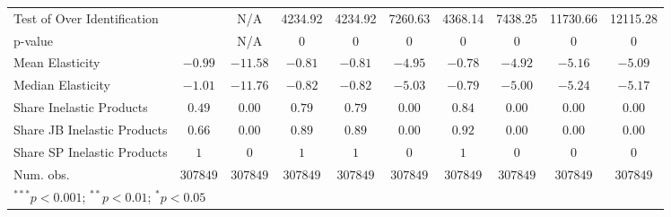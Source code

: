 \begin{tabular}{l c c c c c c c c c}
Test of Over Identification &               & N/A           & 4234.92       & 4234.92       & 7260.63       & 4368.14       & 7438.25       & 11730.66      & 12115.28      \\
p-value                     &               & N/A           & 0             & 0             & 0             & 0             & 0             & 0             & 0             \\
Mean Elasticity             & $-0.99$       & $-11.58$      & $-0.81$       & $-0.81$       & $-4.95$       & $-0.78$       & $-4.92$       & $-5.16$       & $-5.09$       \\
Median Elasticity           & $-1.01$       & $-11.76$      & $-0.82$       & $-0.82$       & $-5.03$       & $-0.79$       & $-5.00$       & $-5.24$       & $-5.17$       \\
Share Inelastic Products    & $0.49$        & $0.00$        & $0.79$        & $0.79$        & $0.00$        & $0.84$        & $0.00$        & $0.00$        & $0.00$        \\
Share JB Inelastic Products & $0.66$        & $0.00$        & $0.89$        & $0.89$        & $0.00$        & $0.92$        & $0.00$        & $0.00$        & $0.00$        \\
Share SP Inelastic Products & $1$           & $0$           & $1$           & $1$           & $0$           & $1$           & $0$           & $0$           & $0$           \\
Num. obs.                   & $307849$      & $307849$      & $307849$      & $307849$      & $307849$      & $307849$      & $307849$      & $307849$      & $307849$      \\
\bottomrule
\multicolumn{10}{l}{\scriptsize{$^{***}p<0.001$; $^{**}p<0.01$; $^{*}p<0.05$}}
\end{tabular}
